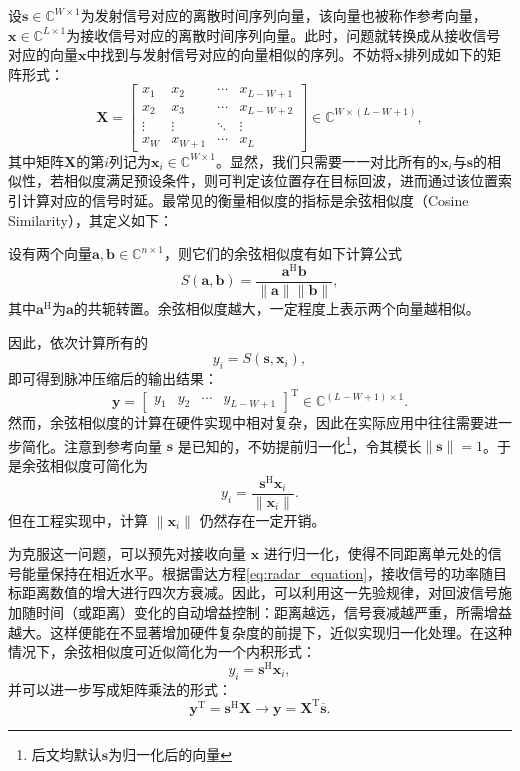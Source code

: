 设\( \bm{s} \in \mathbb{C}^{W \times 1} \)为发射信号对应的离散时间序列向量，该向量也被称作参考向量，\( \bm{x} \in \mathbb{C}^{L \times 1} \)为接收信号对应的离散时间序列向量。此时，问题就转换成从接收信号对应的向量\( \bm{x} \)中找到与发射信号对应的向量相似的序列。不妨将\( \bm{x} \)排列成如下的矩阵形式：
\[
    \mathbf{X} = \begin{bmatrix}
        x_1    & x_2     & \cdots & x_{L-W+1} \\
        x_2    & x_3     & \cdots & x_{L-W+2} \\
        \vdots & \vdots  & \ddots & \vdots    \\
        x_W    & x_{W+1} & \cdots & x_L
    \end{bmatrix} \in \mathbb{C}^{W \times (L-W+1)},
\]
其中矩阵\( \mathbf{X} \)的第\( i \)列记为\( \bm{x}_i \in \mathbb{C}^{W \times 1} \)。显然，我们只需要一一对比所有的\( \bm{x}_i \)与\( \bm{s} \)的相似性，若相似度满足预设条件，则可判定该位置存在目标回波，进而通过该位置索引计算对应的信号时延。最常见的衡量相似度的指标是余弦相似度（Cosine Similarity），其定义如下：
\begin{definition}
    设有两个向量\( \bm{a}, \bm{b} \in \mathbb{C}^{n \times 1} \)，则它们的余弦相似度有如下计算公式
    \[
        S(\bm{a}, \bm{b}) = \frac{\bm{a}^{\mathrm{H}} \bm{b}}{\|\bm{a}\| \|\bm{b}\|},
    \]
    其中\( \bm{a}^{\mathrm{H}} \)为\( \bm{a} \)的共轭转置。余弦相似度越大，一定程度上表示两个向量越相似。
\end{definition}

因此，依次计算所有的
\[
    y_i = S(\bm{s}, \bm{x}_i),
\]
即可得到脉冲压缩后的输出结果：
\[
    \bm{y} = \begin{bmatrix} y_1 & y_2 & \cdots & y_{L-W+1} \end{bmatrix}^{\mathrm{T}}
    \in \mathbb{C}^{(L-W+1) \times 1}.
\]
然而，余弦相似度的计算在硬件实现中相对复杂，因此在实际应用中往往需要进一步简化。注意到参考向量 \( \bm{s} \) 是已知的，不妨提前归一化\footnote{后文均默认\( \bm{s} \)为归一化后的向量}，令其模长\( \left\| \bm{s} \right\| = 1 \)。于是余弦相似度可简化为
\[
    y_i = \frac{\bm{s}^{\mathrm{H}} \bm{x}_i}{\|\bm{x}_i\|}.
\]
但在工程实现中，计算 \( \|\bm{x}_i\| \) 仍然存在一定开销。

为克服这一问题，可以预先对接收向量 \( \bm{x} \) 进行归一化，使得不同距离单元处的信号能量保持在相近水平。根据雷达方程\cref{eq:radar_equation}，接收信号的功率随目标距离数值的增大进行四次方衰减。因此，可以利用这一先验规律，对回波信号施加随时间（或距离）变化的自动增益控制：距离越远，信号衰减越严重，所需增益越大。这样便能在不显著增加硬件复杂度的前提下，近似实现归一化处理。在这种情况下，余弦相似度可近似简化为一个内积形式：
\[
    y_i =  \bm{s}^{\mathrm{H}} \bm{x}_i,
\]
并可以进一步写成矩阵乘法的形式：
\[
    \bm{y}^{\mathrm{T}} = \bm{s}^{\mathrm{H}} \mathbf{X} \rightarrow \bm{y} = \mathbf{X}^{\mathrm{T}} \overline{\bm{s}}.
\]

